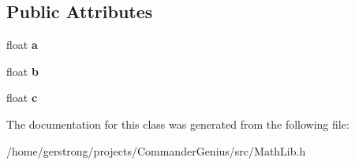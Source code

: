 \subsection*{Public Attributes}
\begin{DoxyCompactItemize}
\item 
\hypertarget{class_parabola_ab3444a520bfbcb132cf8ce94f91e1d94}{
float {\bfseries a}}
\label{class_parabola_ab3444a520bfbcb132cf8ce94f91e1d94}

\item 
\hypertarget{class_parabola_a46ed61dee4603b3b23f8fdb9608e7a03}{
float {\bfseries b}}
\label{class_parabola_a46ed61dee4603b3b23f8fdb9608e7a03}

\item 
\hypertarget{class_parabola_af8c0312b43dde76609764037c0ecb231}{
float {\bfseries c}}
\label{class_parabola_af8c0312b43dde76609764037c0ecb231}

\end{DoxyCompactItemize}


The documentation for this class was generated from the following file:\begin{DoxyCompactItemize}
\item 
/home/gerstrong/projects/CommanderGenius/src/MathLib.h\end{DoxyCompactItemize}

